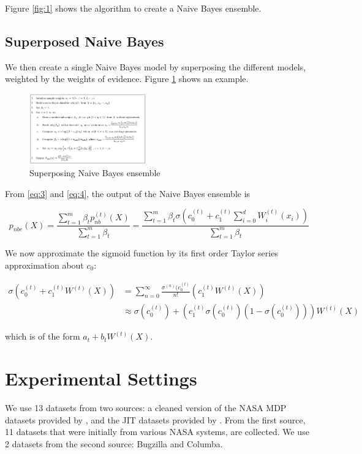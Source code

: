 \documentclass[sigconf]{acmart}
\begin{document}
Figure \ref{fig:1} shows the algorithm to create a Naive Bayes ensemble.

\subsection{Superposed Naive Bayes}
We then create a single Naive Bayes model by superposing the different models, weighted by the weights of evidence. Figure \ref{fig:2} shows an example.

\begin{figure}
\includegraphics[width=0.45\textwidth]{fig1.png}
\caption{Superposing Naive Bayes ensemble}
\label{fig:2}
\end{figure}

From \eqref{eq:3} and \eqref{eq:4}, the output of the Naive Bayes ensemble is

\begin{equation}
p_{nbe}(X) = \frac{\sum\limits_{t=1}^m \beta_t p_{nb}^{(t)}(X)}{\sum\limits_{t=1}^m \beta_t} = \frac{\sum\limits_{t=1}^m \beta_t \sigma\left(c_0^{(t)} + c_1^{(t)} \sum\limits_{i=0}^d W_i^{(t)}(x_i)\right)}{\sum\limits_{t=1}^m \beta_t}
\label{eq:5}
\end{equation}

We now approximate the sigmoid function by its first order Taylor series approximation about $c_0$:

\begin{align}
	\sigma\left(c_0^{(t)} + c_1^{(t)} W^{(t)}(X)\right) &= \sum\limits_{n=0}^\infty \frac{\sigma^{(n)}(c_0^{(t)}}{n!}\left(c_1^{(t)}W^{(t)}(X)\right) \nonumber \\ &\approx \sigma(c_0^{(t)}) + \left( c_1^{(t)} \sigma(c_0^{(t)}) \left( 1 - \sigma(c_0^{(t)}) \right) \right) W^{(t)}(X)
\end{align}

which is of the form $a_t + b_t W^{(t)}(X)$.

\section{Experimental Settings}
We use 13 datasets from two sources: a cleaned version of the NASA MDP datasets provided by \cite{shepperd2013data}, and the JIT datasets provided by \cite{kamei2012large}. From the first source, 11 datasets that were initially from various NASA systems, are collected. We use 2 datasets from the second source: Bugzilla and Columba.
\end{document}
